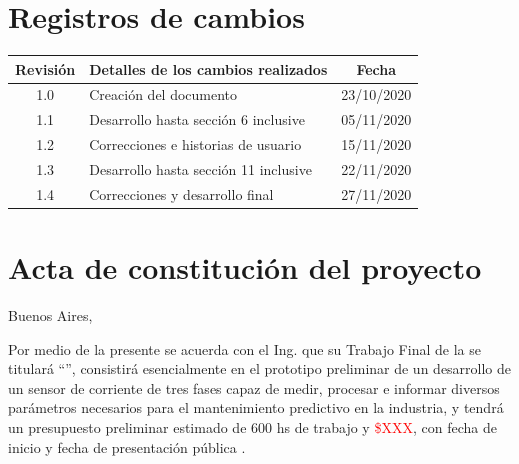 \documentclass[11pt]{charter}
\begin{document}
\maketitle
\thispagestyle{empty}
\pagebreak


\thispagestyle{empty}
{\setlength{\parskip}{0pt}
\tableofcontents{}
}
\pagebreak


\section{Registros de cambios}
\label{sec:registro}


\begin{table}[ht]
\label{tab:registro}
\centering
\begin{tabularx}{\linewidth}{@{}|c|X|c|@{}}
\hline
\rowcolor[HTML]{C0C0C0} 
Revisión & \multicolumn{1}{c|}{\cellcolor[HTML]{C0C0C0}Detalles de los cambios realizados} & Fecha      \\ \hline
1.0      & Creación del documento                                          & 23/10/2020 \\ \hline
1.1      & Desarrollo hasta sección 6 inclusive                            & 05/11/2020 \\ \hline
1.2      & Correcciones e historias de usuario                            & 15/11/2020 \\ \hline
1.3      & Desarrollo hasta sección 11 inclusive						 & 22/11/2020  \\ \hline
1.4      & Correcciones y desarrollo final						 		& 27/11/2020  \\ \hline
\end{tabularx}
\end{table}

\pagebreak



\section{Acta de constitución del proyecto}
\label{sec:acta}

\begin{flushright}
Buenos Aires, \fechaInicioName
\end{flushright}

\vspace{2cm}

Por medio de la presente se acuerda con el Ing. \authorname\hspace{1px} que su Trabajo Final de la \degreename\hspace{1px} se titulará ``\ttitle'', consistirá esencialmente en el prototipo preliminar de un desarrollo de un sensor de corriente de tres fases capaz de medir, procesar e informar diversos parámetros necesarios para el mantenimiento predictivo en la industria, y tendrá un presupuesto preliminar estimado de 600 hs de trabajo y \textcolor{red}{\$XXX}, con fecha de inicio \fechaInicioName\hspace{1px} y fecha de presentación pública \fechaFinalName.
\end{document}

